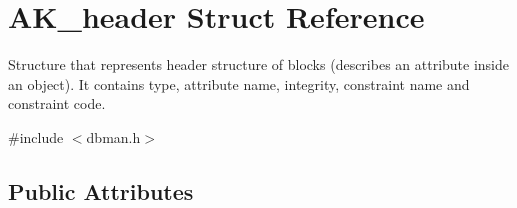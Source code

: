 \hypertarget{structAK__header}{}\section{A\+K\+\_\+header Struct Reference}
\label{structAK__header}


Structure that represents header structure of blocks (describes an attribute inside an object). It contains type, attribute name, integrity, constraint name and constraint code.  




{\ttfamily \#include $<$dbman.\+h$>$}

\subsection*{Public Attributes}
